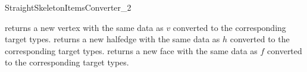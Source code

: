 \begin{ccRefConcept}{StraightSkeletonItemsConverter_2}
\ccOperations

\ccTagFullDeclarations
{}
{ returns a new vertex with the same data as $v$ converted to the corresponding target types.}
\ccGlue
{}
{ returns a new halfedge with the same data as $h$ converted to the corresponding target types.}
\ccGlue
{}
{ returns a new face with the same data as $f$ converted to the corresponding target types.}

\ccHasModels


\ccSeeAlso
{}

\end{ccRefConcept}

